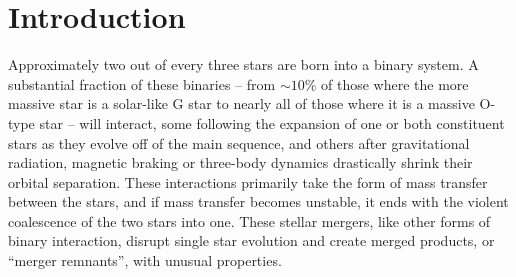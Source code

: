 \chapter{Introduction}


Approximately two out of every three stars are born into a binary system.  A substantial fraction of these binaries -- from $\sim10$\% of those where the more massive star is a solar-like G star to nearly all of those where it is a massive O-type star \citep{moed16} -- will interact, some following the expansion of one or both constituent stars as they evolve off of the main sequence, and others after gravitational radiation, magnetic braking or three-body dynamics drastically shrink their orbital separation.  These interactions primarily take the form of mass transfer between the stars, and if mass transfer becomes unstable, it ends with the violent coalescence of the two stars into one.  These stellar mergers, like other forms of binary interaction, disrupt single star evolution and create merged products, or ``merger remnants'', with unusual properties.


